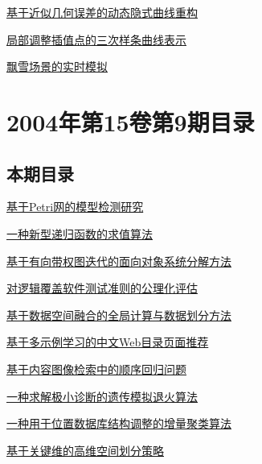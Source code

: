 \documentclass[a4paper]{article}
\begin{document}
\href{http://www.jos.org.cn/ch/reader/download_pdf.aspx?file_no=2004s134&year_id=2004&quarter_id=zk&falg=1}{基于近似几何误差的动态隐式曲线重构}

\href{http://www.jos.org.cn/ch/reader/download_pdf.aspx?file_no=2004s135&year_id=2004&quarter_id=zk&falg=1}{局部调整插值点的三次样条曲线表示}

\href{http://www.jos.org.cn/ch/reader/download_pdf.aspx?file_no=2004s136&year_id=2004&quarter_id=zk&falg=1}{飘雪场景的实时模拟}


\section{\textbf{2004年第15卷第9期目录}}
\subsection{本期目录}
\href{http://www.jos.org.cn/ch/reader/download_pdf.aspx?file_no=20040901&year_id=2004&quarter_id=9&falg=1}{基于Petri网的模型检测研究}

\href{http://www.jos.org.cn/ch/reader/download_pdf.aspx?file_no=20040902&year_id=2004&quarter_id=9&falg=1}{一种新型递归函数的求值算法}

\href{http://www.jos.org.cn/ch/reader/download_pdf.aspx?file_no=20040903&year_id=2004&quarter_id=9&falg=1}{基于有向带权图迭代的面向对象系统分解方法}

\href{http://www.jos.org.cn/ch/reader/download_pdf.aspx?file_no=20040904&year_id=2004&quarter_id=9&falg=1}{对逻辑覆盖软件测试准则的公理化评估}

\href{http://www.jos.org.cn/ch/reader/download_pdf.aspx?file_no=20040905&year_id=2004&quarter_id=9&falg=1}{基于数据空间融合的全局计算与数据划分方法}

\href{http://www.jos.org.cn/ch/reader/download_pdf.aspx?file_no=20040906&year_id=2004&quarter_id=9&falg=1}{基于多示例学习的中文Web目录页面推荐}

\href{http://www.jos.org.cn/ch/reader/download_pdf.aspx?file_no=20040907&year_id=2004&quarter_id=9&falg=1}{基于内容图像检索中的顺序回归问题}

\href{http://www.jos.org.cn/ch/reader/download_pdf.aspx?file_no=20040908&year_id=2004&quarter_id=9&falg=1}{一种求解极小诊断的遗传模拟退火算法}

\href{http://www.jos.org.cn/ch/reader/download_pdf.aspx?file_no=20040909&year_id=2004&quarter_id=9&falg=1}{一种用于位置数据库结构调整的增量聚类算法}

\href{http://www.jos.org.cn/ch/reader/download_pdf.aspx?file_no=20040910&year_id=2004&quarter_id=9&falg=1}{基于关键维的高维空间划分策略}
\end{document}
